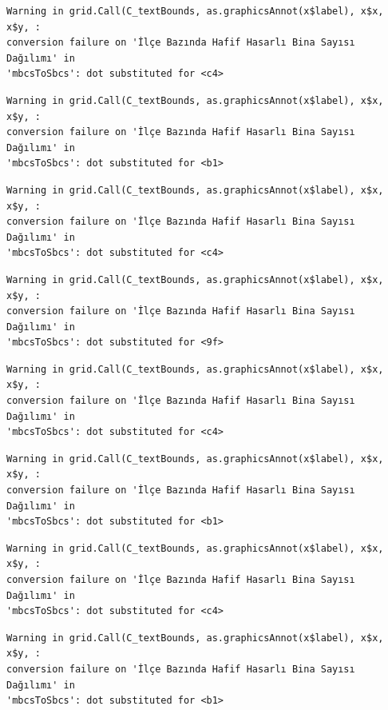 \documentclass[
  11pt,
  a4paper,
  DIV=11,
  numbers=noendperiod]{scrartcl}
\begin{document}
\begin{verbatim}
Warning in grid.Call(C_textBounds, as.graphicsAnnot(x$label), x$x, x$y, :
conversion failure on 'İlçe Bazında Hafif Hasarlı Bina Sayısı Dağılımı' in
'mbcsToSbcs': dot substituted for <c4>
\end{verbatim}

\begin{verbatim}
Warning in grid.Call(C_textBounds, as.graphicsAnnot(x$label), x$x, x$y, :
conversion failure on 'İlçe Bazında Hafif Hasarlı Bina Sayısı Dağılımı' in
'mbcsToSbcs': dot substituted for <b1>
\end{verbatim}

\begin{verbatim}
Warning in grid.Call(C_textBounds, as.graphicsAnnot(x$label), x$x, x$y, :
conversion failure on 'İlçe Bazında Hafif Hasarlı Bina Sayısı Dağılımı' in
'mbcsToSbcs': dot substituted for <c4>
\end{verbatim}

\begin{verbatim}
Warning in grid.Call(C_textBounds, as.graphicsAnnot(x$label), x$x, x$y, :
conversion failure on 'İlçe Bazında Hafif Hasarlı Bina Sayısı Dağılımı' in
'mbcsToSbcs': dot substituted for <9f>
\end{verbatim}

\begin{verbatim}
Warning in grid.Call(C_textBounds, as.graphicsAnnot(x$label), x$x, x$y, :
conversion failure on 'İlçe Bazında Hafif Hasarlı Bina Sayısı Dağılımı' in
'mbcsToSbcs': dot substituted for <c4>
\end{verbatim}

\begin{verbatim}
Warning in grid.Call(C_textBounds, as.graphicsAnnot(x$label), x$x, x$y, :
conversion failure on 'İlçe Bazında Hafif Hasarlı Bina Sayısı Dağılımı' in
'mbcsToSbcs': dot substituted for <b1>
\end{verbatim}

\begin{verbatim}
Warning in grid.Call(C_textBounds, as.graphicsAnnot(x$label), x$x, x$y, :
conversion failure on 'İlçe Bazında Hafif Hasarlı Bina Sayısı Dağılımı' in
'mbcsToSbcs': dot substituted for <c4>
\end{verbatim}

\begin{verbatim}
Warning in grid.Call(C_textBounds, as.graphicsAnnot(x$label), x$x, x$y, :
conversion failure on 'İlçe Bazında Hafif Hasarlı Bina Sayısı Dağılımı' in
'mbcsToSbcs': dot substituted for <b1>
\end{verbatim}
\end{document}
